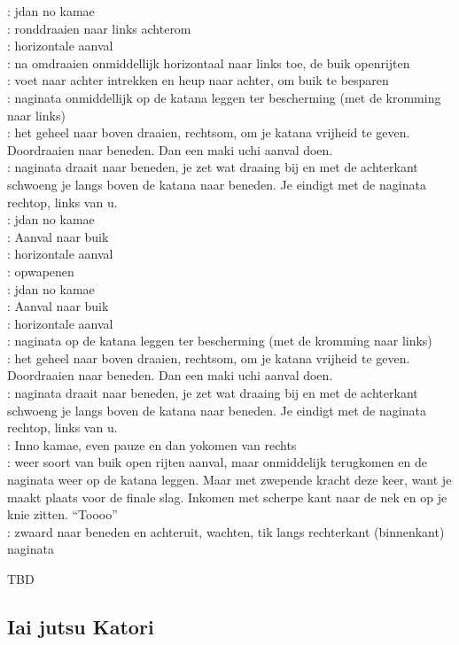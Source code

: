 \pA: jdan no kamae\\
\pB: ronddraaien naar links achterom\\
\pA: horizontale aanval\\
\pB: na omdraaien onmiddellijk horizontaal naar links toe, de buik openrijten\\
\pA: voet naar achter intrekken en heup naar achter, om buik te besparen\\
\pB: naginata onmiddellijk op de katana leggen ter bescherming (met de kromming naar links)\\
\pA: het geheel naar boven draaien, rechtsom, om je katana vrijheid te geven. Doordraaien naar beneden. Dan een maki uchi aanval doen.\\
\pB: naginata draait naar beneden, je zet wat draaing bij en met de achterkant schwoeng je langs boven de katana naar beneden. Je eindigt met de naginata rechtop, links van u.\\
\pA: jdan no kamae\\
\pB: Aanval naar buik\\
\pA: horizontale aanval\\ 
\pB: opwapenen\\
\pA: jdan no kamae\\
\pB: Aanval naar buik\\
\pA: horizontale aanval\\ 
\pB: naginata op de katana leggen ter bescherming (met de kromming naar links)\\
\pA: het geheel naar boven draaien, rechtsom, om je katana vrijheid te geven. Doordraaien naar beneden. Dan een maki uchi aanval doen.\\
\pB: naginata draait naar beneden, je zet wat draaing bij en met de achterkant schwoeng je langs boven de katana naar beneden. Je eindigt met de naginata rechtop, links van u.\\
\pA: Inno kamae, even pauze en dan yokomen van rechts\\
\pB: weer soort van buik open rijten aanval, maar onmiddelijk terugkomen en de naginata weer op de katana leggen. Maar met zwepende kracht deze keer, want je maakt plaats voor de finale slag. Inkomen met scherpe kant naar de nek en op je knie zitten. ``Toooo''\\
\pA: zwaard naar beneden en achteruit, wachten, tik langs rechterkant (binnenkant) naginata

TBD

\subsection{Iai jutsu Katori}

